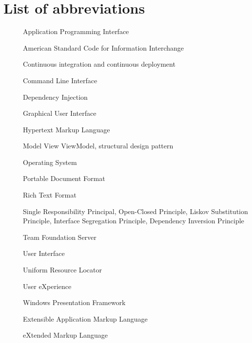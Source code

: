 \chapter*{List of abbreviations}

\begin{multicols}{2}
    \raggedright
    \begin{description}
        \item [] Application Programming Interface
        \item [] American Standard Code for Information Interchange \cite{randal_ascii_2015}
        \item [] Continuous integration and continuous deployment
        \item [] Command Line Interface
        \item [] Dependency Injection \cite{deursen_dependency_2019}
        \item [] Graphical User Interface
        \item [] Hypertext Markup Language
        \item [] Model View ViewModel, structural design pattern \cite{katz_mvvm_2022}
        \item [] Operating System
        \item [] Portable Document Format
        \item [] Rich Text Format
        \item [] Single Responsibility Principal, Open-Closed Principle, Liskov Substitution Principle, Interface Segregation Principle, Dependency Inversion Principle \cite{hall_adaptive_2017}
        \item [] Team Foundation Server
        \item [] User Interface
        \item [] Uniform Resource Locator
        \item [] User eXperience
        \item [] Windows Presentation Framework \cite{stilgar_state_2018}
        \item [] Extensible Application Markup Language
        \item [] eXtended Markup Language
    \end{description}
\end{multicols}

